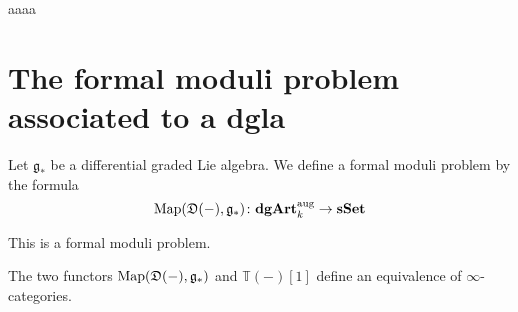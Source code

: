 \begin{refsection}
\begin{defin} \label{def dgla}
aaaa
\end{defin}

\section{The formal moduli problem associated to a dgla}

Let $\mathfrak g_*$ be a differential graded Lie algebra. We define a formal moduli problem by the formula
\[
\operatorname{\mathrm{Map}}(\mathfrak D(-), \mathfrak g_*) \colon \mathbf{dgArt}_k^{\mathrm{aug}} \to \mathbf{sSet}
\]

\begin{lemma}
This is a formal moduli problem.
\end{lemma}

\begin{thm}
The two functors $\operatorname{\mathrm{Map}}(\mathfrak D(-), \mathfrak g_*)$ and $\mathbb T(-)[1]$ define an equivalence of $\infty$-categories.
\end{thm}

\printbibliography[heading = local]

\end{refsection}
